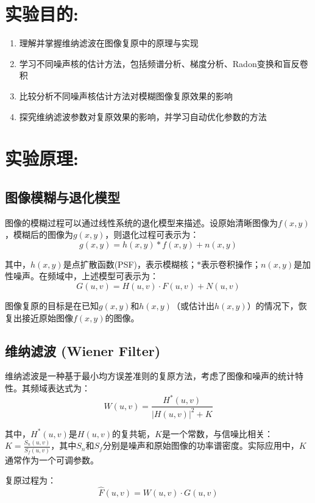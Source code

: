 \documentclass[a4paper,11pt,UTF8]{ctexart}
\begin{document}
\section{实验目的:}
\begin{enumerate}
    \item 理解并掌握维纳滤波在图像复原中的原理与实现
    \item 学习不同噪声核的估计方法，包括频谱分析、梯度分析、Radon变换和盲反卷积
    \item 比较分析不同噪声核估计方法对模糊图像复原效果的影响
    \item 探究维纳滤波参数对复原效果的影响，并学习自动优化参数的方法
\end{enumerate}

\section{实验原理:}
\subsection{图像模糊与退化模型}
图像的模糊过程可以通过线性系统的退化模型来描述。设原始清晰图像为$f(x,y)$，模糊后的图像为$g(x,y)$，则退化过程可表示为：
\begin{equation}
g(x,y) = h(x,y) * f(x,y) + n(x,y)
\end{equation}

其中，$h(x,y)$是点扩散函数(PSF)，表示模糊核；$*$表示卷积操作；$n(x,y)$是加性噪声。在频域中，上述模型可表示为：
\begin{equation}
G(u,v) = H(u,v) \cdot F(u,v) + N(u,v)
\end{equation}

图像复原的目标是在已知$g(x,y)$和$h(x,y)$（或估计出$h(x,y)$）的情况下，恢复出接近原始图像$f(x,y)$的图像。

\subsection{维纳滤波 (Wiener Filter)}
维纳滤波是一种基于最小均方误差准则的复原方法，考虑了图像和噪声的统计特性。其频域表达式为：
\begin{equation}
W(u,v) = \frac{H^*(u,v)}{|H(u,v)|^2 + K}
\end{equation}

其中，$H^*(u,v)$是$H(u,v)$的复共轭，$K$是一个常数，与信噪比相关：$K = \frac{S_n(u,v)}{S_f(u,v)}$，其中$S_n$和$S_f$分别是噪声和原始图像的功率谱密度。实际应用中，$K$通常作为一个可调参数。

复原过程为：
\begin{equation}
\hat{F}(u,v) = W(u,v) \cdot G(u,v)
\end{equation}
\end{document}
